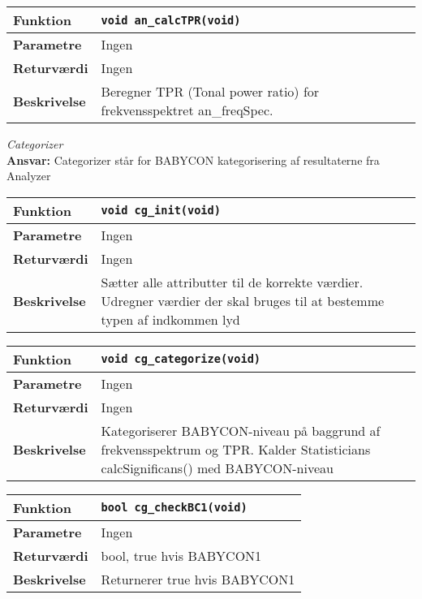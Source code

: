 \begin{center}
    \begin{tabular}{ | l | p{} |}
    \hline
    \textbf{Funktion}	& \verb+void an_calcTPR(void) +						\\ \hline
    \textbf{Parametre} 	& Ingen		\\ \hline
    \textbf{Returværdi}	& Ingen							\\ \hline
    \textbf{Beskrivelse}& Beregner TPR (Tonal power ratio) for frekvensspektret an\_freqSpec.  \\ \hline
    \end{tabular}
\end{center} 


\textit{Categorizer} \\
\textbf{Ansvar:} Categorizer står for BABYCON kategorisering af resultaterne fra Analyzer

\begin{center}
    \begin{tabular}{ | l | p{} |}
    \hline
    \textbf{Funktion}	& \verb+void cg_init(void)+ \\ \hline
    \textbf{Parametre} 	& Ingen\\ \hline
    \textbf{Returværdi}	& Ingen	 								\\ \hline
    \textbf{Beskrivelse}& Sætter alle attributter til de korrekte værdier. Udregner værdier der skal bruges til at bestemme typen af indkommen lyd	\\ \hline
    \end{tabular}
\end{center}

\begin{center}
    \begin{tabular}{ | l | p{} |}
    \hline
    \textbf{Funktion}	& \verb+void cg_categorize(void) +						\\ \hline
    \textbf{Parametre} 	& Ingen\\ \hline
    \textbf{Returværdi}	& Ingen	 								\\ \hline
    \textbf{Beskrivelse}& Kategoriserer BABYCON-niveau på baggrund af frekvensspektrum og TPR. Kalder Statisticians calcSignificans() med BABYCON-niveau		\\ \hline
    \end{tabular}
\end{center}

\begin{center}
    \begin{tabular}{ | l | p{} |}
    \hline
    \textbf{Funktion}	& \verb+bool cg_checkBC1(void) +						\\ \hline
    \textbf{Parametre} 	& Ingen 								\\ \hline
    \textbf{Returværdi}	& bool, true hvis BABYCON1 	 								\\ \hline
    \textbf{Beskrivelse}& Returnerer true hvis BABYCON1		\\ \hline
    \end{tabular}
\end{center}

